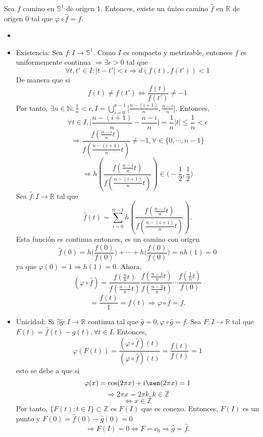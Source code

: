 \begin{lem}
  Sea $f$ camino en $\mathbb{S}^{1}$ de origen $1$. Entonces, existe un único camino $\hat{ f }$ en $\mathbb{R}$ de origen $0$ tal que $\varphi \circ \hat{ f } = f$.
\end{lem}

\begin{dem}
  \begin{itemize}
    \item []
    \item Existencia: Sea $f : I \to \mathbb{S}^{1}$. Como $I$ es compacto y metrizable, entonces $f$ es uniformemente continua $\Rightarrow \exists \epsilon > 0$ tal que
      \[
        \forall t, t' \in I : | t - t' | < \epsilon \Rightarrow d(f(t), f(t')) < 1
      \]
       De manera que si
       \[
         f(t) \neq f(t') \Leftrightarrow \frac{f(t)}{f(t')} \neq -1
       \]
       Por tanto, $\exists n \in \mathbb{N} : \frac{1}{n} < \epsilon, I = \bigcup_{i = 0}^{n - 1} \Big [ \frac{n - (i + 1)}{n}, \frac{n - i}{n} \Big ]$. Entonces, 
      \[ 
        \forall t \in I, \Big | \frac{n - (i + 1)}{n} - \frac{n - i}{n} \Big | = \frac{1}{n}| t | \leq \frac{1}{n} < \epsilon  
      \] 
      \[ 
        \Rightarrow \frac{f(\frac{n - i}{n}t)}{f(\frac{n - (i + 1)}{n}t)} \neq -1, \forall \in \{ 0, \cdots,n - 1 \}
      \] 
      \[ 
        \Rightarrow h(\frac{f(\frac{n - i}{n}t)}{f(\frac{n - (i + 1)}{n}t)}) \in \Big ( -\frac{1}{2}, \frac{1}{2} \Big )
      \] 
      Sea $\hat{ f } : I \to \mathbb{R}$ tal que
      \[ 
        \hat{ f }(t) = \sum_{i = 0}^{n - 1} h(\frac{f(\frac{n - i}{n}t)}{f(\frac{n - (i + 1)}{n}t)}).
      \] 
      Esta función es continua entonces, es un camino con origen
      \[ 
        \hat{ f }(0) = h \Big (\frac{f(0)}{f(0)} \Big ) + \cdots + h \Big (\frac{f(0)}{f(0)} \Big ) = n h(1) = 0
      \] 
      ya que $\varphi(0) = 1 \Rightarrow h(1) = 0$. Ahora,
      \[ 
        (\varphi \circ \hat{ f }) = \frac{f(\frac{n}{n}t)}{f(\frac{n - 1}{n}t)} \frac{f(\frac{n - 1}{n}t)}{f(\frac{n - 2}{n}t)} \cdots \frac{f(\frac{1}{n}t)}{f(0)}
      \] 
      \[ 
        = \frac{f(t)}{1} = f(t) \Rightarrow \varphi \circ \overline{f} = f.
      \] 
    \item Unicidad: Si $\exists \hat{ g } : I \to \mathbb{R}$ continua tal que $\hat{ g } = 0, \varphi \circ \hat{ g  } = f$. Sea $F : I \to \mathbb{R}$ tal que $F(t) = \hat{ f }(t) - g(t), \forall t \in I$. Entonces,
      \[ 
        \varphi(F(t)) = \frac{(\varphi \circ \hat{ f })(t)}{(\varphi \circ \hat{ f })(t)} = \frac{f(t)}{f(t)} = 1
      \] 
      esto se debe a que si
      \[
        \varphi(x) = \cos(2 \pi x) + i \sen(2 \pi x) = 1 
      \]
      \[ 
        \Rightarrow 2 \pi x = 2 \pi k, k \in \mathbb{Z} 
      \] 
      \[ 
        \Leftrightarrow x \in \mathbb{Z} 
      \] 
      Por tanto, $\{ F(t) : t \in I \} \subset \mathbb{Z}$ es $F(I)$ que es conexo. Entonces, $F(I)$ es un punto y $F(0) = \hat{ f }(0) - \hat{ g }(0) = 0$
      \[ 
        \Rightarrow F(I) = 0 \Leftrightarrow F = c_{0} \Rightarrow \hat{ g } = \hat{ f }.
      \] 
  \end{itemize}
\end{dem}

